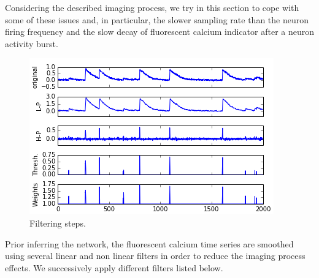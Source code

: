 \documentclass[wcp]{jmlr}
\begin{document}
Considering the described imaging process, we try in this
section to cope with some of these issues and, in particular, the slower
sampling rate than the neuron firing frequency and the slow decay of
fluorescent calcium indicator after a neuron activity burst.


\begin{figure}%
\caption{Filtering steps.}\label{wrap-fig:1}
\includegraphics[width=\linewidth]{images/fig_filtering_recut.png}
\end{figure}


Prior inferring the network, the fluorescent calcium time series
are smoothed using several linear and non linear filters in
order to reduce the imaging process effects. We successively apply different
filters listed below.


\end{document}
